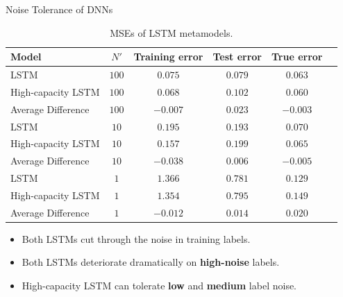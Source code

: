 \documentclass[9pt,handout]{beamer}
\begin{document}
\begin{frame}{Noise Tolerance of DNNs}
    
    \begin{table}[ht!]
        \centering
        \begin{tabular}{lccccc}
            \toprule
            \textbf{Model}      & \textbf{$N'$}         & \textbf{Training error}                & \textbf{Test error}               & \textbf{True error}\\
            \midrule
            LSTM                & $100$                & $0.075$         & $0.079$     & $0.063$ \\ 
            High-capacity LSTM  & $100$                & $0.068$         & $0.102$     & $0.060$ \\
            Average Difference  & $100$                & $-0.007$       & $0.023$     & $-0.003$ \\
            \hline
            LSTM                & $10$                 & $0.195$         & $0.193$     & $0.070$ \\
            High-capacity LSTM  & $10$                 & $0.157$         & $0.199$     & $0.065$ \\
            Average Difference  & $10$                 & $-0.038$       & $0.006$     & $-0.005$ \\
            \hline
            LSTM                & $1$                  & $1.366$         & $0.781$     & $0.129$ \\
            High-capacity LSTM  & $1$                  & $1.354$         & $0.795$     & $0.149$ \\
            Average Difference  & $1$                  & $-0.012$       & $0.014$     &\textcolor{color10_5}{$0.020$} \\
            \bottomrule
        \end{tabular}
        \caption{MSEs of LSTM metamodels.}
    \end{table}

    \begin{itemize}
        \item   Both LSTMs cut through the noise in training labels.
        \item   Both LSTMs deteriorate dramatically on \textbf{high-noise} labels.
        \item   High-capacity LSTM can tolerate \textbf{low} and \textbf{medium} label noise.
    \end{itemize}

\end{frame}
\end{document}
